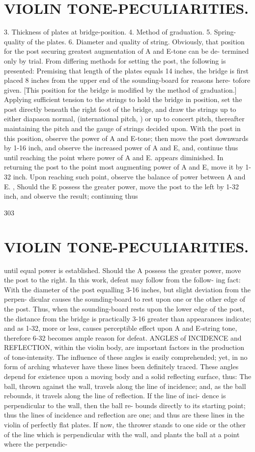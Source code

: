 \documentclass{article}
\begin{document}
\section*{VIOLIN TONE-PECULIARITIES.}
3. Thickness of plates at bridge-position. 4. Method of graduation. 5. Spring-quality of the plates. 6. Diameter and quality of string. Obviously, that position for the post securing greatest augmentation of A and E-tone can be de- termined only by trial. From differing methods for setting the post, the following is presented: Premising that length of the plates equals 14 inches, the bridge is first placed 8 inches from the upper end of the sounding-board for reasons here- tofore given. [This position for the bridge is modified by the method of graduation.] Applying sufficient tension to the strings to hold the bridge in position, set the post directly beneath the right foot of the bridge, and draw the strings up to either diapason normal, (international pitch, ) or up to concert pitch, thereafter maintaining the pitch and the gauge of strings decided upon. With the post in this position, observe the power of A and E-tone; then move the post downwards by 1-16 inch, and observe the increased power of A and E, and, continue thus until reaching the point where power of A and E. appears diminished. In returning the post to the point most augmenting power of A and E, move it by 1-32 inch. Upon reaching such point, observe the balance of power between A and E. , Should the E possess the greater power, move the post to the left by 1-32 inch, and observe the result; continuing thus

303

\section*{VIOLIN TONE-PECULIARITIES.}
until equal power is established. Should the A possess the greater power, move the post to the right. In this work, defeat may follow from the follow- ing fact: With the diameter of the post equalling 3-16 inches, but slight deviation from the perpen- dicular causes the sounding-board to rest upon one or the other edge of the post. Thus, when the sounding-board rests upon the lower edge of the post, the distance from the bridge is practically 3-16 greater than appearances indicate; and as 1-32, more or less, causes perceptible effect upon A and E-string tone, therefore 6-32 becomes ample reason for defeat. ANGLES of INCIDENCE and REFLECTION, within the violin body, are important factors in the production of tone-intensity. The influence of these angles is easily comprehended; yet, in no form of arching whatever have these lines been definitely traced. These angles depend for existence upon a moving body and a solid reflecting surface, thus: The ball, thrown against the wall, travels along the line of incidence; and, as the ball rebounds, it travels along the line of reflection. If the line of inci- dence is perpendicular to the wall, then the ball re- bounds directly to its starting point; thus the lines of incidence and reflection are one; and thus are these lines in the violin of perfectly flat plates. If now, the thrower stands to one side or the other of the line which is perpendicular with the wall, and plants the ball at a point where the perpendic-
\end{document}
